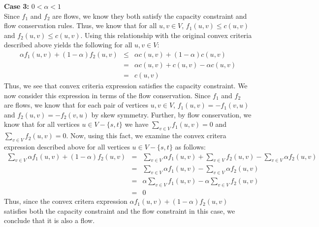 \documentclass[11pt]{article}
\begin{document}
\begin{sol}
\textbf{Case 3:} $0 < \alpha  < 1$ \\
Since $f_1$ and $f_2$ are flows, we know they both satisfy the capacity constraint and flow conservation rules. Thus, we know that for all $u,v \in V$, $f_1(u,v) \leq c(u,v)$ and $f_2(u,v) \leq c(u,v)$. Using this relationship with the original convex criteria described above yields the following for all $u,v \in V$:
\begin{eqnarray*}
\alpha f_1(u,v) + (1 - \alpha)f_2(u,v) & \leq & \alpha c(u,v) + (1 - \alpha)c(u,v) \\
& = & \alpha c(u,v) + c(u,v) - \alpha c(u,v) \\
& = & c(u,v)
\end{eqnarray*}
Thus, we see that convex criteria expression satisfies the capacity constraint. We now consider this expression in terms of the flow conservation. Since $f_1$ and $f_2$ are flows, we know that for each pair of vertices $u, v \in V$, $f_1(u,v) = -f_1(v,u)$ and $f_2(u,v) = -f_2(v,u)$ by skew symmetry. Further, by flow conservation, we know that for all vertices $u \in V - \{s,t\}$ we have $\sum_{v \in V}f_1(u,v) = 0$ and  $\sum_{v \in V}f_2(u,v) = 0$. Now, using this fact, we examine the convex critera expression described above for all vertices $u \in V - \{s,t\}$ as follows:
\begin{eqnarray*}
\sum_{v \in V}\alpha f_1(u,v) + (1 - \alpha)f_2(u,v) & = & \sum_{v \in V}\alpha f_1(u,v) + \sum_{v \in V}f_2(u,v) - \sum_{v \in V}\alpha f_2(u,v) \\
& = & \sum_{v \in V}\alpha f_1(u,v) - \sum_{v \in V}\alpha f_2(u,v) \\
& = & \alpha\sum_{v \in V} f_1(u,v) - \alpha\sum_{v \in V} f_2(u,v) \\
& = & 0
\end{eqnarray*}
Thus, since the convex critera expression $\alpha f_1(u,v) + (1 - \alpha)f_2(u,v)$ satisfies both the capacity constraint and the flow constraint in this case, we conclude that it is also a flow.
\end{sol}
\end{document}
